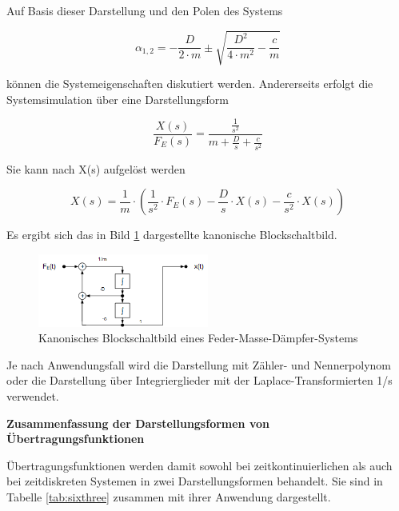 \noindent Auf Basis dieser Darstellung und den Polen des Systems

\begin{equation}\label{eq:sixseventyone}
\alpha _{1,2} =-\frac{D}{2\cdot m} \pm \sqrt{\frac{D^{2} }{4\cdot m^{2} } -\frac{c}{m} }
\end{equation}

\noindent k\"{o}nnen die Systemeigenschaften diskutiert werden. Andererseits erfolgt die Systemsimulation \"{u}ber eine Darstellungsform

\begin{equation}\label{eq:sixseventytwo}
\frac{X\left(s\right)}{F_{E} \left(s\right)} =\frac{\frac{1}{s^{2} } }{m+\frac{D}{s} +\frac{c}{s^{2} } }
\end{equation}

\noindent Sie kann nach X(s) aufgel\"{o}st werden

\begin{equation}\label{eq:sixseventythree}
X\left(s\right)=\frac{1}{m} \cdot \left(\frac{1}{s^{2} } \cdot F_{E} \left(s\right)-\frac{D}{s} \cdot X\left(s\right)-\frac{c}{s^{2} } \cdot X\left(s\right)\right)
\end{equation}

Es ergibt sich das in Bild \ref{fig:FederMasseDaempferDirektstruktur2} dargestellte kanonische Blockschaltbild. 

\begin{figure}[H]
  \centerline{\includegraphics[width=0.5\textwidth]{Kapitel6/Bilder/image8.png}}
  \caption{Kanonisches Blockschaltbild eines Feder-Masse-D\"{a}mpfer-Systems}
  \label{fig:FederMasseDaempferDirektstruktur2}
\end{figure}

\noindent Je nach Anwendungsfall wird die Darstellung mit Z\"{a}hler- und Nennerpolynom oder die Darstellung \"{u}ber Integrierglieder mit der Laplace-Transformierten 1/s verwendet.\bigskip

{\selectfont
\noindent\textbf{Zusammenfassung der Darstellungsformen von Übertragungsfunktionen}}\smallskip

\noindent \"{U}bertragungsfunktionen werden damit sowohl bei zeitkontinuierlichen als auch bei zeitdiskreten Systemen in zwei Darstellungsformen behandelt. Sie sind in Tabelle \ref{tab:sixthree} zusammen mit ihrer Anwendung dargestellt.


